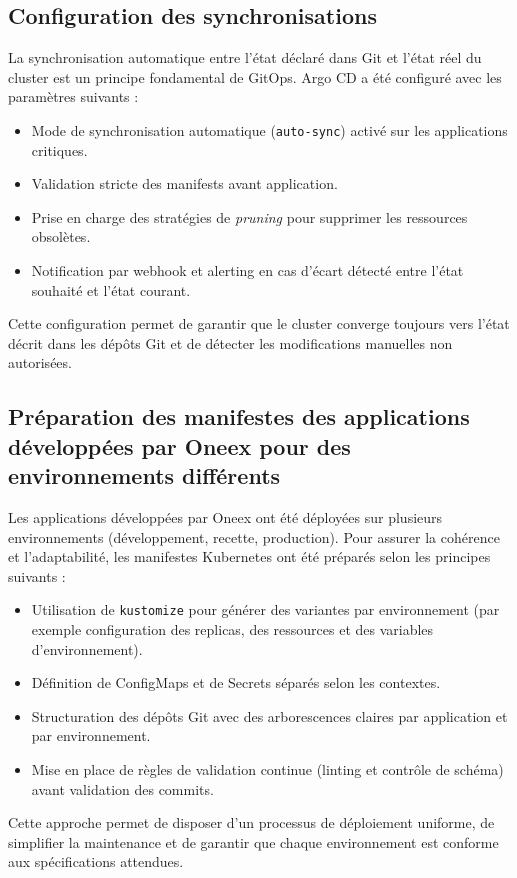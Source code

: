 \subsection{Configuration des synchronisations}

La synchronisation automatique entre l’état déclaré dans Git et l’état réel du cluster est un principe fondamental de GitOps.
Argo CD a été configuré avec les paramètres suivants :
\begin{itemize}
	\item Mode de synchronisation automatique (\texttt{auto-sync}) activé sur les applications critiques.
	\item Validation stricte des manifests avant application.
	\item Prise en charge des stratégies de \textit{pruning} pour supprimer les ressources obsolètes.
	\item Notification par webhook et alerting en cas d’écart détecté entre l’état souhaité et l’état courant.
\end{itemize}

Cette configuration permet de garantir que le cluster converge toujours vers l’état décrit dans les dépôts Git et de détecter les modifications manuelles non autorisées.

\subsection{Préparation des manifestes des applications développées par Oneex pour des environnements différents}

Les applications développées par Oneex ont été déployées sur plusieurs environnements (développement, recette, production).
Pour assurer la cohérence et l’adaptabilité, les manifestes Kubernetes ont été préparés selon les principes suivants :
\begin{itemize}
	\item Utilisation de \texttt{kustomize} pour générer des variantes par environnement (par exemple configuration des replicas, des ressources et des variables d’environnement).
	\item Définition de ConfigMaps et de Secrets séparés selon les contextes.
	\item Structuration des dépôts Git avec des arborescences claires par application et par environnement.
	\item Mise en place de règles de validation continue (linting et contrôle de schéma) avant validation des commits.
\end{itemize}

Cette approche permet de disposer d’un processus de déploiement uniforme, de simplifier la maintenance et de garantir que chaque environnement est conforme aux spécifications attendues.
